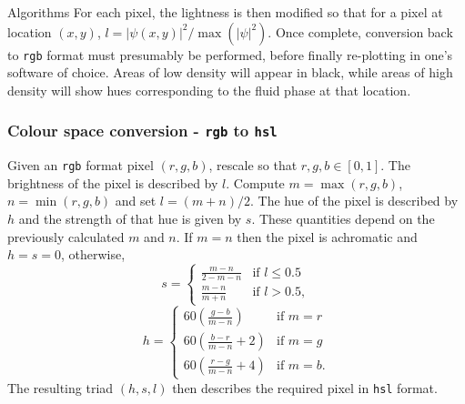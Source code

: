 \begin{chapter}{\label{app:algorithms}Algorithms}
For each pixel, the lightness is then modified so that for a pixel at location $(x,y)$, $l = |\psi(x,y)|^2/\max(|\psi|^2)$. Once complete, conversion back to {\tt rgb} format must presumably be performed, before finally re-plotting in one's software of choice. Areas of low density will appear in black, while areas of high density will show hues corresponding to the fluid phase at that location.

\subsubsection{Colour space conversion - {\tt rgb} to {\tt hsl}}
Given an {\tt rgb} format pixel $(r,g,b)$, rescale so that $r,g,b \in [0,1]$. The brightness of the pixel is described by $l$. Compute $m = \max(r,g,b)$, $n = \min(r,g,b)$ and set $l = (m+n)/2$. The hue of the pixel is described by $h$ and the strength of that hue is given by $s$. These quantities depend on the previously calculated $m$ and $n$. If $m=n$ then the pixel is achromatic and $h=s=0$, otherwise,
\begin{equation}
s =
    \begin{cases}
      \frac{m-n}{2 - m - n} &\mbox{if } l \leq 0.5 \\
      \frac{m-n}{m+n} &\mbox{if } l > 0.5,
    \end{cases}
\end{equation}
\begin{equation}
h =
    \begin{cases}
      60(\frac{g-b}{m-n}) &\mbox{if } m=r \\
      60(\frac{b-r}{m-n}+2) &\mbox{if } m=g \\
      60(\frac{r-g}{m-n}+4) &\mbox{if } m=b.
    \end{cases}
\end{equation}
The resulting triad $(h,s,l)$ then describes the required pixel in {\tt hsl} format.


\end{chapter}
